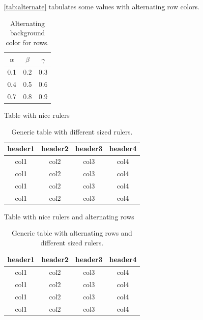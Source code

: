 \autoref{tab:alternate} tabulates some values with alternating row colors.
\begin{table}[H]
\caption{Alternating background color for rows.}
\centering
{}
\begin{tabular}{ccc}
\hline
\hline 
$\alpha$ & $\beta$ & $\gamma$
\\
\hline 
\hline 
0.1 & 0.2 & 0.3
\\
0.4 & 0.5 & 0.6
\\
0.7 & 0.8 & 0.9
\\
\hline
\hline 
\end{tabular}
\label{tab:alternate}
\end{table} 

Table with nice rulers 

\begin{table}[h]
  \caption{Generic table with different sized rulers.}
  \footnotesize%
  \begin{center}
    \begin{tabular}{cccc}
      \toprule
      header1 & header2 & header3 & header4 \\
      \midrule
      col1 &  col2 & col3 & col4 \\
      col1 &  col2 & col3 & col4 \\
      col1 &  col2 & col3 & col4 \\
      col1 &  col2 & col3 & col4 \\
      \bottomrule
    \end{tabular}
  \end{center}
  \label{tab:tablerule}
\end{table}

Table with nice rulers and alternating rows

\begin{table}[h]
  \caption{Generic table with alternating rows and different sized rulers.}
  \footnotesize%
  \begin{center}
    \begin{tabular}{cccc}
      \toprule
      header1 & header2 & header3 & header4 \\
      \midrule
      col1 &  col2 & col3 & col4 \\
      col1 &  col2 & col3 & col4 \\
      col1 &  col2 & col3 & col4 \\
      col1 &  col2 & col3 & col4 \\
      \bottomrule
    \end{tabular}
  \end{center}
  \label{tab:tablerule2}
\end{table}

